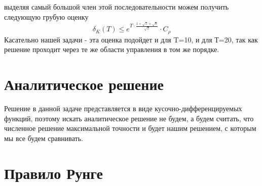 \documentclass[a4paper,12pt]{article}
\begin{document}
выделяя самый большой член этой последовательности можем получить следующую грубую оценку
\[
    \delta_K(T) \leqslant e^{T\cdot \frac{1+\sqrt{5}+\sqrt{8}}{\sqrt{2}}}\cdot C_{\rho}
\]
Касательно нашей задачи - эта оценка подойдет и для T=10, и для Т=20, так как решение проходит через те же области управления в том же порядке.

\section{Аналитическое решение}

Решение в данной задаче представляется в виде кусочно-дифференцируемых функций, поэтому искать аналитическое решение не будем, а будем считать, что численное решение максимальной точности и будет нашим решением, с которым мы все будем сравнивать.

\section{Правило Рунге}
\end{document}
